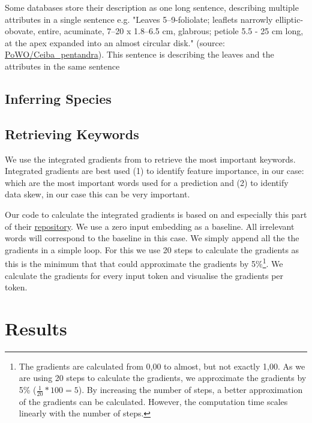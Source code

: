 \documentclass[a4paper, 12pt, oneside]{book} %
\begin{document}
Some databases store their description as one long sentence, describing multiple attributes in a single sentence e.g. "Leaves 5–9-foliolate; leaflets narrowly elliptic-obovate, entire, acuminate, 7–20 x 1.8–6.5 cm, glabrous; petiole 5.5 - 25 cm long, at the apex expanded into an almost circular disk." (source: \href{http://powo.science.kew.org/taxon/urn:lsid:ipni.org:names:1166232-2}{PoWO/Ceiba\_pentandra}). 
This sentence is describing the leaves and the attributes in the same sentence 

\subsection{Inferring Species}
\subsection{Retrieving Keywords}
We use the integrated gradients from \autocite{sundararajan_axiomatic_2017} to retrieve the most important keywords.
Integrated gradients are best used (1) to identify feature importance, in our case: which are the most important words used for a prediction and (2) to identify data skew, in our case this can be very important. %

Our code to calculate the integrated gradients is based on \textcite{gardner_allennlp_2017} and especially this part of their  \href{https://github.com/allenai/allennlp/tree/master/allennlp/interpret}{repository}.
We use a zero input embedding as a baseline.
All irrelevant words will correspond to the baseline in this case.
We simply append all the the gradients in a simple loop.
For this we use 20 steps to calculate the gradients as this is the minimum that \textcite{sundararajan_axiomatic_2017} that could approximate the gradients by 5\%\footnote{The gradients are calculated from 0,00 to almost, but not exactly 1,00. As we are using 20 steps to calculate the gradients, we approximate the gradients by 5\% (\(\frac{1}{20} * 100 = 5\)). By increasing the number of steps, a better approximation of the gradients can be calculated. However, the computation time scales linearly with the number of steps.}.
We calculate the gradients for every input token and visualise the gradients per token.





\newpage
\section{Results}
\end{document}
